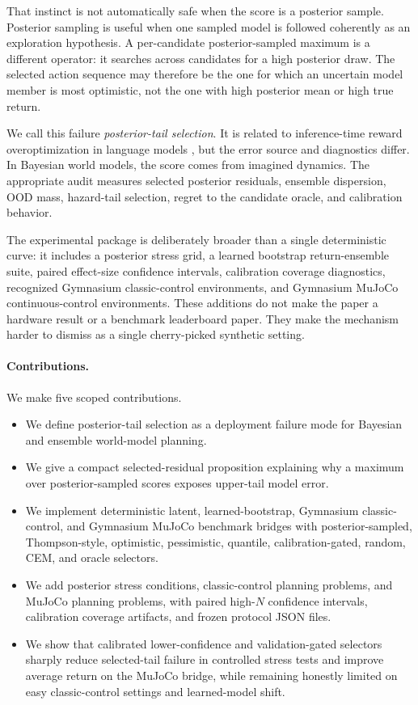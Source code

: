 \documentclass{article}
\begin{document}
That instinct is not automatically safe when the score is a posterior sample.
Posterior sampling is useful when one sampled model is followed coherently as
an exploration hypothesis. A per-candidate posterior-sampled maximum is a
different operator: it searches across candidates for a high posterior draw.
The selected action sequence may therefore be the one for which an uncertain
model member is most optimistic, not the one with high posterior mean or high
true return.

We call this failure \emph{posterior-tail selection}. It is related to
inference-time reward overoptimization in language models
\citep{gao2023scaling,jinnai2024regularized,huang2025bon,yu2026caution,
hsu2026tails}, but the error source and diagnostics differ. In Bayesian world
models, the score comes from imagined dynamics. The appropriate audit measures
selected posterior residuals, ensemble dispersion, OOD mass, hazard-tail
selection, regret to the candidate oracle, and calibration behavior.

The experimental package is deliberately broader than a single deterministic
curve: it includes a posterior stress grid, a learned bootstrap
return-ensemble suite, paired effect-size confidence intervals, calibration
coverage diagnostics, recognized Gymnasium classic-control environments, and
Gymnasium MuJoCo continuous-control environments. These additions do not make
the paper a hardware result or a benchmark leaderboard paper. They make the
mechanism harder to dismiss as a single cherry-picked synthetic setting.

\paragraph{Contributions.}
We make five scoped contributions.
\begin{itemize}
    \item We define posterior-tail selection as a deployment failure mode for
    Bayesian and ensemble world-model planning.
    \item We give a compact selected-residual proposition explaining why a
    maximum over posterior-sampled scores exposes upper-tail model error.
    \item We implement deterministic latent, learned-bootstrap, Gymnasium
    classic-control, and Gymnasium MuJoCo benchmark bridges with
    posterior-sampled, Thompson-style, optimistic, pessimistic, quantile,
    calibration-gated, random, CEM, and oracle selectors.
    \item We add \VThreeStressConditions{} posterior stress conditions,
    \VFourGymProblems{} classic-control planning problems, and
    \VFourMujocoProblems{} MuJoCo planning problems, with paired high-$N$
    confidence intervals, calibration coverage artifacts, and frozen protocol
    JSON files.
    \item We show that calibrated lower-confidence and validation-gated
    selectors sharply reduce selected-tail failure in controlled stress tests
    and improve average return on the MuJoCo bridge, while remaining honestly
    limited on easy classic-control settings and learned-model shift.
\end{itemize}
\end{document}
